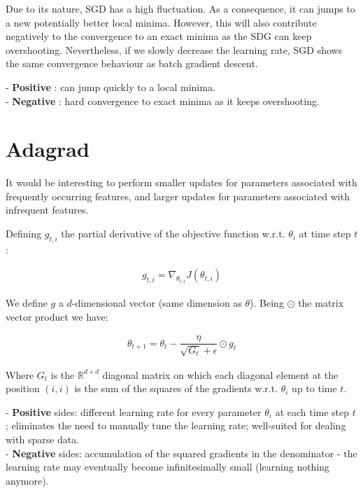 \documentclass[10pt]{article} %
\theoremstyle{question-style}
\begin{document}
\begin{flushleft}
Due to its nature, SGD has a high fluctuation. As a consequence, it can jumps to a new potentially better local minima. However, this will also contribute negatively to the convergence to an exact minima as the SDG can keep overshooting. Nevertheless, if we slowly decrease the learning rate, SGD shows the same convergence behaviour as batch gradient descent. 

- \textbf{Positive} :  can jump quickly to a local minima.\\

- \textbf{Negative} : hard convergence to exact minima as it keeps overshooting.

\section{Adagrad}

It would be interesting to perform smaller updates for parameters associated with frequently occurring features, and larger updates for parameters associated with infrequent features.

Defining $g_{t, i}$ the partial derivative of the objective function w.r.t. $\theta_i$ at time step $t$: 

\begin{align*}
    g_{t, i} = \nabla_{\theta_{t,i}}J(\theta_{t, i}) 
\end{align*}

We define $g$ a $d$-dimensional vector (same dimension as $\theta$). Being $\odot$ the matrix vector product we have:  

\begin{align} \label{adagrad}
    \theta_{t+1} = \theta_t - \dfrac{\eta}{\sqrt{G_t} + \epsilon} \odot g_t
\end{align}


Where $G_t$ is the $ \mathbb{R}^{d \times d}$ diagonal matrix on which each diagonal element at the position $(i, i)$ is the sum of the squares of the gradients w.r.t. $\theta_i$ up to time $t$.

- \textbf{Positive} sides: different learning rate for every parameter $\theta_i$ at each time step $t$; eliminates the need to manually tune the learning rate; well-suited for dealing with sparse data.\\

- \textbf{Negative} sides: accumulation of the squared gradients in the denominator - the learning rate may eventually become infinitesimally small (learning nothing anymore).


\end{flushleft}
\end{document}
